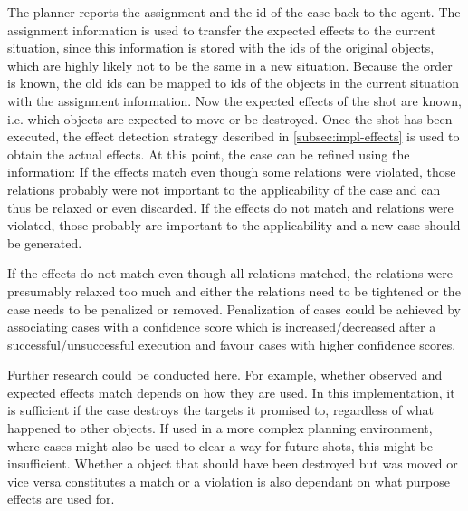 The planner reports the assignment and the id of the case back to the agent. The assignment information is used to transfer the expected effects to the current situation, since this information is stored with the ids of the original objects, which are highly likely not to be the same in a new  situation.
Because the order is known, the old ids can be mapped to ids of the objects in the current situation with the assignment information.
Now the expected effects of the shot are known, i.e. which objects are expected to move or be destroyed.
Once the shot has been executed, the effect detection strategy described in \ref{subsec:impl-effects} is used to obtain the actual effects.
At this point, the case can be refined using the information: If the effects match even though some relations were violated, those relations probably were not important to the applicability of the case and can thus be relaxed or even discarded.
If the effects do not match and relations were violated, those probably are important to the applicability and a new case should be generated.

If the effects do not match even though all relations matched, the relations were presumably relaxed too much and either the relations need to be tightened or the case needs to be penalized or removed. Penalization of cases could be achieved by associating cases with a confidence score which is increased/decreased after a successful/unsuccessful execution and favour cases with higher confidence scores.


Further research could be conducted here. For example, whether observed and expected effects match depends on how they are used. In this implementation, it is sufficient if the case destroys the targets it promised to, regardless of what happened to other objects.
If used in a more complex planning environment, where cases might also be used to clear a way for future shots, this might be insufficient. Whether a object that should have been destroyed but was moved or vice versa constitutes a match or a violation is also dependant on what purpose effects are used for.